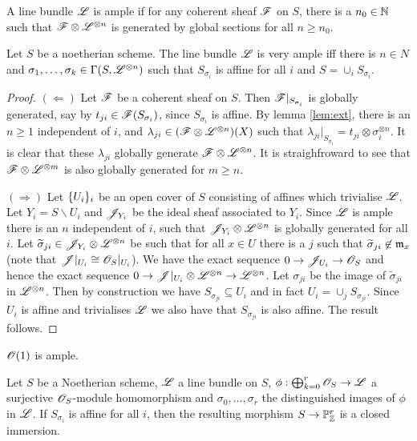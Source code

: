 \documentclass{memoir}
\begin{document}
\begin{definition}
    A line bundle $\mathscr{L}$ is ample if for any coherent sheaf $\mathscr{F}$ on $S$, there is a $n_0\in \mathbb{N}$ such that $\mathscr{F}\otimes \mathscr{L}^{\otimes n}$ is generated by global sections for all $n\ge n_0$.
\end{definition}
\begin{thm}
    Let $S$ be a noetherian scheme.
    The line bundle $\mathscr{L}$ is very ample iff there is $n\in N$ and $\sigma_1,\dots,\sigma_k\in\Gamma(S,\mathscr{L}^{\otimes n})$ such that $S_{\sigma_i}$ is affine for all $i$ and $S = \cup_iS_{\sigma_i}$.
\end{thm}
\begin{proof}
    $(\Leftarrow)$ Let $\mathscr{F}$ be a coherent sheaf on $S$.
    Then $\mathscr{F}|_{S_{\sigma_i}}$ is globally generated, say by $t_{ji}\in \mathscr{F}(S_{\sigma_i})$, since $S_{\sigma_i}$ is affine.
    By lemma \ref{lem:ext}, there is an $n\ge 1$ independent of $i$, and $\lambda_{ji}\in (\mathscr{F}\otimes \mathscr{L}^{\otimes n})(X)$ such that $\lambda_{ji}|_{S_{\sigma_i}} = t_{ji}\otimes \sigma_i^{\otimes n}$.
    It is clear that these $\lambda_{ji}$ globally generate $\mathscr{F}\otimes \mathscr{L}^{\otimes n}$.
    It is straighfroward to see that $\mathscr{F}\otimes \mathscr{L}^{\otimes m}$ is also globally generated for $m\ge n$.

    $(\Rightarrow)$ Let $\lbrace U_i\rbrace_i$ be an open cover of $S$ consisting of affines which trivialise $\mathscr{L}$.
    Let $Y_i = S\backslash U_i$ and $\mathscr{J}_{Y_i}$ be the ideal sheaf associated to $Y_i$.
    Since $\mathscr{L}$ is ample there is an $n$ independent of $i$, such that $\mathscr{J}_{Y_i}\otimes \mathscr{L}^{\otimes n}$ is globally generated for all $i$.
    Let $\widetilde\sigma_{ji}\in \mathscr{J}_{Y_i}\otimes \mathscr{L}^{\otimes n}$ be such that for all $x\in U$ there is a $j$ such that $\widetilde\sigma_{ji}\not\in \mathfrak{m}_x$ (note that $\mathscr{J}|_{U_i}\cong \mathscr{O}_S|_{U_i}$).
    We have the exact sequence $0\to \mathscr{J}_{U_i} \to \mathscr{O}_S$ and hence the exact sequence $0\to \mathscr{J}|_{U_i}\otimes \mathscr{L}^{\otimes n} \to \mathscr{L}^{\otimes n}$.
    Let $\sigma_{ji}$ be the image of $\tilde\sigma_{ji}$ in $\mathscr{L}^{\otimes n}$.
    Then by construction we have $S_{\sigma_{ji}}\subseteq U_i$ and in fact $U_i = \cup_{j}S_{\sigma_{ji}}$.
    Since $U_i$ is affine and trivialises $\mathscr{L}$ we also have that $S_{\sigma_{ji}}$ is also affine.
    The result follows.
\end{proof}
\begin{corollary}
    $\mathscr{O}(1)$ is ample.
\end{corollary}
\begin{lemma}
    Let $S$ be a Noetherian scheme, $\mathscr{L}$ a line bundle on $S$, $\phi:\bigoplus_{k=0}^r\mathscr{O}_S\to \mathscr{L}$ a surjective $\mathscr{O}_S$-module homomorphism and $\sigma_0,\dots,\sigma_r$ the distinguished images of $\phi$ in $\mathscr{L}$.
    If $S_{\sigma_i}$ is affine for all $i$, then the resulting morphism $S\to \mathbb{P}^r_{\mathbb{Z}}$ is a closed immersion.
\end{lemma}
\end{document}
